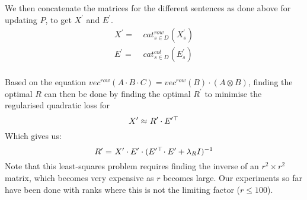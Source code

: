 \documentclass[11pt,a4paper]{article}
\newcommand{\trans}{{}^{\top}}
\newcommand{\by}{{\times}}
\newcommand{\kron}{{\otimes}}
\begin{document}
We then concatenate the matrices for the different sentences as done above for
updating $P$, to get $X^{\prime}$ and $E^{\prime}$.  
\vspace{-0.5ex}
\begin{align*}
X^\prime =~& cat^{row}_{s{\in}D}(X^\prime_s)
\\
E^\prime =~& cat^{col}_{s{\in}D}(E^\prime_s)
\\[-4ex]\nonumber
\end{align*}

Based on the equation 
$vec^{row}(A\cdot B\cdot C){=}vec^{row}(B)\cdot (A\kron B)$, finding the
optimal $R$ can then be done by finding the optimal $R^\prime$ to minimise the
regularised quadratic loss for 
\vspace{-0.5ex}
\begin{align*}
X^{\prime} \approx~& R^\prime \cdot E^{\prime}\/\trans
\\[-4ex]\nonumber
\end{align*}
Which gives us:
\vspace{-0.5ex}
\begin{align*}
R^\prime =~& X^{\prime} \cdot E^{\prime} \cdot (E^{\prime}\/\trans\! \cdot E^{\prime} + \lambda_R I\/)^{-1}
\\[-4ex]\nonumber
\end{align*}
Note that this least-squares problem requires finding the inverse of an
$r^2\by r^2$ matrix, which becomes very expensive as $r$ becomes large.  Our
experiments so far have been done with ranks where this is not the limiting
factor ($r\leq 100$).
\end{document}
